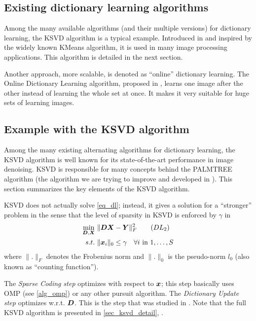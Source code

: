 \subsection{Existing dictionary learning algorithms}
Among the many available algorithms (and their multiple versions) for dictionary learning, the \ac{KSVD} algorithm is a typical example. Introduced in \cite{aharon_k-svd:_2006} and inspired by the widely known \gls{KMeans} algorithm, it is used in many image processing applications. This algorithm is detailed in the next section.

Another approach, more scalable, is denoted as “online” dictionary learning. The Online Dictionary Learning algorithm, proposed in \cite{mairal_online_2010}, learns one image after the other instead of learning the whole set at once. It makes it very suitable for huge sets of learning images.


\subsection{Example with the \acs{KSVD} algorithm}

Among the many existing alternating algorithms for dictionary learning, the \ac{KSVD} algorithm is well known for its state-of-the-art performance in image denoising. \ac{KSVD} is responsible for many concepts behind the \acs{PALMTREE} algorithm (the algorithm we are trying to improve and developed in \cite{chabiron_optimization_2016}). This section summarizes the key elements of the \ac{KSVD} algorithm.

\ac{KSVD} does not actually solve \eqref{eq_dl}; instead, it gives a solution for a “stronger” problem in the sense that the level of sparsity in \ac{KSVD} is enforced by $\gamma$ in
\begin{align*}
\underset{\bm{D},\bm{X}}{\min}~ & \lVert \bm{D}\bm{X}-\bm{Y} \rVert^2_F \tag{$DL_2$}\label{eq_dl_ksvd} \\
s.t.~& \lVert \bm{x}_i \rVert_0 \le \gamma \quad \forall i \text{ in } 1,\dots,S
\end{align*}
where $\lVert . \rVert_F$ denotes the Frobenius norm and $\lVert . \rVert_0$ is the pseudo-norm $l_0$ (also known as “counting function”).

The \emph{Sparse Coding step} optimizes with respect to $\bm{x}$; this step basically uses \ac{OMP} (see \cref{alg_omp}) or any other pursuit algorithm. The \emph{Dictionary Update step} optimizes w.r.t. $\bm{D}$. This is the step that was studied in \cite{chabiron_optimization_2016}. Note that the full \ac{KSVD} algorithm is presented in \cref{sec_ksvd_detail}, .

